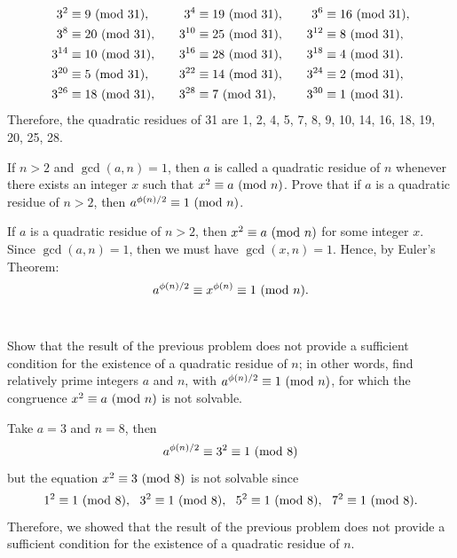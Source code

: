 \begin{solution}
\begin{enumerate}
        \begin{align*}
            3^2 &\equiv 9 \ (\mathrm{mod}\ 31),& \quad 3^4 &\equiv 19 \ (\mathrm{mod}\ 31),& \quad 3^6 &\equiv 16 \ (\mathrm{mod}\ 31), \\
            3^8 &\equiv 20 \ (\mathrm{mod}\ 31),& \quad 3^{10} &\equiv 25 \ (\mathrm{mod}\ 31),& \quad 3^{12} &\equiv 8 \ (\mathrm{mod}\ 31), \\
            3^{14} &\equiv 10 \ (\mathrm{mod}\ 31),& \quad 3^{16} &\equiv 28 \ (\mathrm{mod}\ 31),& \quad 3^{18} &\equiv 4 \ (\mathrm{mod}\ 31). \\
            3^{20} &\equiv 5 \ (\mathrm{mod}\ 31),& \quad 3^{22} &\equiv 14 \ (\mathrm{mod}\ 31),& \quad 3^{24} &\equiv 2 \ (\mathrm{mod}\ 31), \\
            3^{26} &\equiv 18 \ (\mathrm{mod}\ 31),& \quad 3^{28} &\equiv 7 \ (\mathrm{mod}\ 31), & \quad 3^{30} &\equiv 1 \ (\mathrm{mod}\ 31).
        \end{align*}
        Therefore, the quadratic residues of 31 are 1, 2, 4, 5, 7, 8, 9, 10, 14, 16, 18, 19, 20, 25, 28. \\
    \end{enumerate}
\end{solution}

\begin{exercise}
    If $n>2$ and $\gcd(a,n) = 1$, then $a$ is called a quadratic residue of $n$ whenever there exists an integer $x$ such that $x^2 \equiv a \ (\mathrm{mod}\ n)$. Prove that if $a$ is a quadratic residue of $n > 2$, then $a^{\phi(n)/2} \equiv 1 \ (\mathrm{mod}\ n)$. \\
\end{exercise}

\begin{solution}
    If $a$ is a quadratic residue of $n > 2$, then $x^2 \equiv a \ (\mathrm{mod}\ n)$ for some integer $x$. Since $\gcd(a,n) = 1$, then we must have $\gcd(x,n) = 1$. Hence, by Euler's Theorem:
    $$a^{\phi(n)/2} \equiv x^{\phi(n)} \equiv 1 \ (\mathrm{mod}\ n).$$ \\
\end{solution}

\begin{exercise}
    Show that the result of the previous problem does not provide a sufficient condition for the existence of a quadratic residue of $n$; in other words, find relatively prime integers $a$ and $n$, with $a^{\phi(n)/2} \equiv 1 \ (\mathrm{mod}\ n)$, for which the congruence $x^2 \equiv a \ (\mathrm{mod}\ n)$ is not solvable. \\
\end{exercise}

\begin{solution}
    Take $a = 3$ and $n = 8$, then
    $$a^{\phi(n)/2} \equiv 3^2 \equiv 1 \ (\mathrm{mod}\ 8)$$
    but the equation $x^2 \equiv 3 \ (\mathrm{mod}\ 8)$ is not solvable since
    $$1^2 \equiv 1 \ (\mathrm{mod}\ 8), \ \ 3^2 \equiv 1 \ (\mathrm{mod}\ 8), \ \ 5^2 \equiv 1 \ (\mathrm{mod}\ 8), \ \ 7^2 \equiv 1 \ (\mathrm{mod}\ 8).$$
    Therefore, we showed that the result of the previous problem does not provide a sufficient condition for the existence of a quadratic residue of $n$.
\end{solution}

